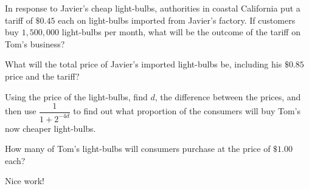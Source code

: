 \documentclass{ximera}
\begin{document}
\begin{question}
In response to Javier's cheap light-bulbs, authorities in coastal California put a tariff of $\$0.45$ each on light-bulbs imported from Javier's factory. If customers buy $1,500,000$ light-bulbs per month, what will be the outcome of the tariff on Tom's business?


\begin{multipleChoice}
    \end{multipleChoice}
\begin{hint}
What will the total price of Javier's imported light-bulbs be, including his $\$0.85$ price and the tariff?
\end{hint}
\begin{hint}
Using the price of the light-bulbs, find $d$, the difference between the prices, and then use $\dfrac{1}{1+2^{-4d}}$ to find out what proportion of the consumers will buy Tom's now cheaper light-bulbs.
\end{hint}
\begin{hint}
How many of Tom's light-bulbs will consumers purchase at the price of $\$1.00$ each?
\end{hint}

Nice work!
\end{question}
\end{document}

